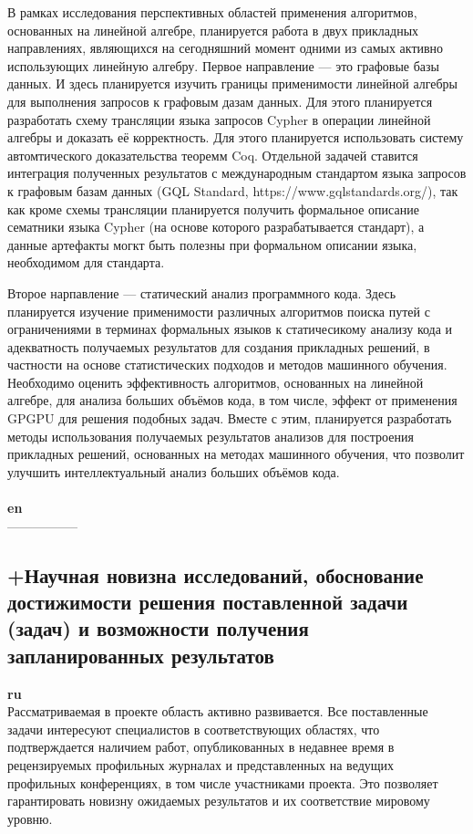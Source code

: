 \documentclass[12pt]{article}  %
\theoremstyle{remark}
\begin{document}
В рамках исследования перспективных областей применения алгоритмов, основанных на линейной алгебре, планируется работа в двух прикладных направлениях, являющихся на сегодняшний момент одними из самых активно использующих линейную алгебру. Первое направление --- это графовые базы данных. И здесь планируется изучить границы применимости линейной алгебры для выполнения запросов к графовым дазам данных. Для этого планируется разработать схему трансляции языка запросов Cypher в операции линейной алгебры и доказать её корректность. Для этого планируется использовать систему автомтического доказательства теоремм Coq. Отдельной задачей ставится интеграция полученных результатов с международным стандартом языка запросов к графовым базам данных (GQL Standard, https://www.gqlstandards.org/), так как кроме схемы трансляции планируется получить формальное описание сематники языка Cypher (на основе которого разрабатывается стандарт), а данные артефакты могкт быть полезны при формальном описании языка, необходимом для стандарта.

Второе нарпавление --- статический анализ программного кода. Здесь планируется изучение применимости различных алгоритмов поиска путей с ограничениями в терминах формальных языков к статичесикому анализу кода и адекватность получаемых результатов для создания прикладных решений, в частности на основе статистических подходов и методов машинного обучения. Необходимо оценить эффективность алгоритмов, основанных на линейной алгебре, для анализа больших объёмов кода, в том числе, эффект от применения GPGPU для решения подобных задач. Вместе с этим, планируется разработать методы использования получаемых результатов анализов для построения прикладных решений, основанных на методах машинного обучения, что позволит улучшить интеллектуальный анализ больших объёмов кода.
\\
\\
\textbf{en}\\
-----------------

\subsection{+Научная новизна исследований, обоснование достижимости решения поставленной задачи (задач) и возможности получения запланированных результатов}

\textbf{ru}\\
%
Рассматриваемая в проекте область активно развивается. Все поставленные задачи интересуют специалистов в соответствующих областях, что подтверждается наличием работ, опубликованных в недавнее время в рецензируемых профильных журналах и представленных на ведущих профильных конференциях, в том числе участниками проекта. Это позволяет гарантировать новизну ожидаемых результатов и их соответствие мировому уровню.
\end{document}
